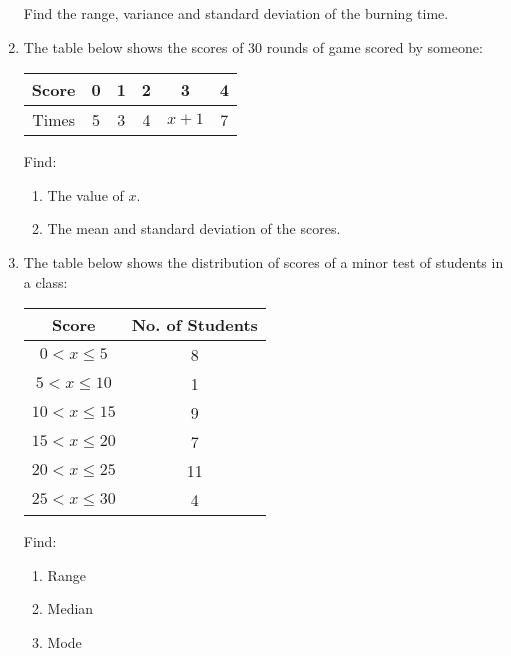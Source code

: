 \documentclass{report}
\begin{document}
\begin{multicols}{2}
\begin{enumerate}
          Find the range, variance and standard deviation of the burning time.

    \item The table below shows the scores of 30 rounds of game scored by someone:
          \begin{center}
            \begin{tabular}{|c|c|c|c|c|c|}
              \hline
              Score & 0 & 1 & 2 & 3     & 4 \\
              \hline
              Times & 5 & 3 & 4 & $x+1$ & 7 \\
              \hline
            \end{tabular}
          \end{center}
          Find:
          \begin{enumerate}
            \item The value of $x$.
            \item The mean and standard deviation of the scores.
          \end{enumerate}

    \item The table below shows the distribution of scores of a minor test of students in
          a class:
          \begin{center}
            \begin{tabular}{|c|c|}
              \hline
              Score            & No. of Students \\
              \hline
              $0 < x \leq 5$   & 8               \\
              $5 < x \leq 10$  & 1               \\
              $10 < x \leq 15$ & 9               \\
              $15 < x \leq 20$ & 7               \\
              $20 < x \leq 25$ & 11              \\
              $25 < x \leq 30$ & 4               \\
              \hline
            \end{tabular}
          \end{center}
          Find:
          \begin{enumerate}
            \item Range
            \item Median
            \item Mode
          \end{enumerate}


\end{enumerate}
\end{multicols}
\end{document}
